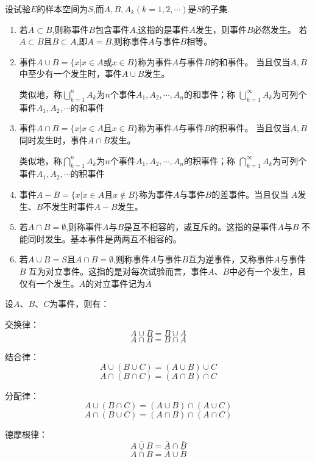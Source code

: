 \begin{definition}[事件间的关系与事件的运算]
  设试验$E$的样本空间为$S$,而$A,B,A_k (k=1,2,\cdots)$是$S$的子集.
  \begin{enumerate}
    \item 若$A\subset B$,则称事件$B${\heiti 包含}事件$A$,这指的是事件$A$发生，则事件$B$必然发生。
    若$A \subset B$且$B \subset A$,即$A=B$,则称事件$A$与事件$B${\heiti 相等}。
    \item 事件$A \cup B=\{x|x\in A \mbox{或} x \in B\} $称为事件$A$与事件$B$的{\heiti 和事件}。
    当且仅当$A,B$中至少有一个发生时，事件$A \cup B$发生。

    类似地，称$\bigcup\limits_{k=1}^n A_k$为$n$个事件$A_1,A_2,\cdots,A_n$的和事件；称
    $\bigcup\limits_{k=1}^{\infty}A_k$为可列个事件$A_1,A_2,\cdots$的和事件
    \item 事件$A \cap B=\{x|x\in A \mbox{且} x \in B\} $称为事件$A$与事件$B$的{\heiti 积事件}。
    当且仅当$A,B$同时发生时，事件$A \cap B$发生。

    类似地，称$\bigcap\limits_{k=1}^n A_k$为$n$个事件$A_1,A_2,\cdots,A_n$的积事件；称
    $\bigcap\limits_{k=1}^{\infty}A_k$为可列个事件$A_1,A_2,\cdots$的积事件
    \item 事件$A-B=\{x|x\in A \mbox{且}x\notin B\}$称为事件$A$与事件$B$的{\heiti 差事件}。当且仅当
    $A$发生、$B$不发生时事件$A-B$发生。
    \item 若$A \cap B=\emptyset$,则称事件$A$与$B$是互不相容的，或{\heiti 互斥的}。这指的是事件$A$与$B$
    不能同时发生。基本事件是两两互不相容的。
    \item 若$A\cup B=S$且$A \cap B=\emptyset$,则称事件$A$与事件$B$互为{\heiti 逆事件}，又称事件$A$与事件$B$
    互为{\heiti 对立事件}。这指的是对每次试验而言，事件$A$、$B$中必有一个发生，且仅有一个发生。$A$的对立事件记为$\overline{A}$ 
  \end{enumerate}
\end{definition}

\begin{theorem}[集合运算定律]
  设$A$、$B$、$C$为事件，则有：
  
  交换律：
  $$A \cup B=B\cup A$$
  $$A\cap B=B\cap A$$ 
  
  结合律：
  $$A\cup (B\cup C)=(A\cup B)\cup C$$
  $$A\cap (B\cap C)=(A\cap B)\cap C$$
  
  分配律：
  $$A \cup(B\cap C)=(A \cup B)\cap(A\cup C)$$
  $$A \cap(B\cup C)=(A \cap B)\cap(A\cap C)$$


  德摩根律：
  $$\overline{A\cup B}=\overline{A}\cap\overline{B}$$
  $$\overline{A\cap B}=\overline{A}\cup\overline{B}$$
\end{theorem}

